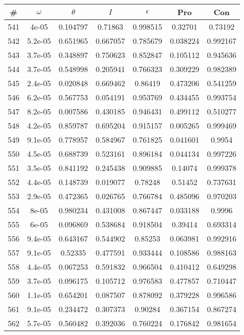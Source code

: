 \newpage
\begin{table}
\begin{tabular}{c|c|c|c|c|c|c}
\# & $\omega$ & $\theta$ & $I$ & $\epsilon$ & Pro & Con\\
\hline
541 & 4e-05 & 0.104797 & 0.71863 & 0.998515 & 0.32701 & 0.73192\\
542 & 5.2e-05 & 0.651965 & 0.667057 & 0.785679 & 0.038224 & 0.992167\\
543 & 3.7e-05 & 0.348897 & 0.750623 & 0.852847 & 0.105112 & 0.945636\\
544 & 3.7e-05 & 0.548998 & 0.205941 & 0.766323 & 0.309229 & 0.982389\\
545 & 2.4e-05 & 0.020848 & 0.669462 & 0.86419 & 0.473206 & 0.541259\\
546 & 6.2e-05 & 0.567753 & 0.054191 & 0.953769 & 0.434455 & 0.993754\\
547 & 8.2e-05 & 0.007586 & 0.430185 & 0.946431 & 0.499112 & 0.510277\\
548 & 4.2e-05 & 0.859787 & 0.695204 & 0.915157 & 0.005265 & 0.999469\\
549 & 9.1e-05 & 0.778957 & 0.584967 & 0.761825 & 0.041601 & 0.9954\\
550 & 4.5e-05 & 0.688739 & 0.523161 & 0.896184 & 0.044134 & 0.997226\\
551 & 3.5e-05 & 0.841192 & 0.245438 & 0.909885 & 0.14074 & 0.999378\\
552 & 4.4e-05 & 0.148739 & 0.019077 & 0.78248 & 0.51452 & 0.737631\\
553 & 2.9e-05 & 0.472365 & 0.026765 & 0.766784 & 0.485096 & 0.970203\\
554 & 8e-05 & 0.980234 & 0.431008 & 0.867447 & 0.033188 & 0.9996\\
555 & 6e-05 & 0.096869 & 0.538684 & 0.918504 & 0.39414 & 0.693314\\
556 & 9.4e-05 & 0.643167 & 0.544902 & 0.85253 & 0.063981 & 0.992916\\
557 & 9.1e-05 & 0.52335 & 0.477591 & 0.933444 & 0.108586 & 0.988163\\
558 & 4.4e-05 & 0.067253 & 0.591832 & 0.966504 & 0.410412 & 0.649298\\
559 & 3.7e-05 & 0.096175 & 0.105712 & 0.976583 & 0.477857 & 0.710447\\
560 & 1.1e-05 & 0.654201 & 0.087507 & 0.878092 & 0.379228 & 0.996586\\
561 & 9.1e-05 & 0.234472 & 0.307373 & 0.90284 & 0.367154 & 0.867274\\
562 & 5.7e-05 & 0.560482 & 0.392036 & 0.760224 & 0.176842 & 0.981654\\

\end{tabular}
\end{table}
